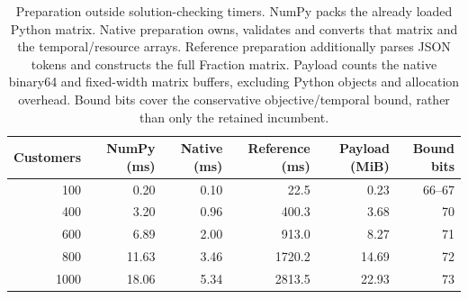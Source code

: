\begin{table}[htbp]
\centering\small
\begin{tabular}{@{}rrrrrr@{}}
\toprule
Customers & NumPy (ms) & Native (ms) & Reference (ms) & Payload (MiB) & Bound bits\\
\midrule
100 & 0.20 & 0.10 & 22.5 & 0.23 & 66--67\\
400 & 3.20 & 0.96 & 400.3 & 3.68 & 70\\
600 & 6.89 & 2.00 & 913.0 & 8.27 & 71\\
800 & 11.63 & 3.46 & 1720.2 & 14.69 & 72\\
1000 & 18.06 & 5.34 & 2813.5 & 22.93 & 73\\
\bottomrule
\end{tabular}
\caption{Preparation outside solution-checking timers. NumPy packs the already loaded Python matrix. Native preparation owns, validates and converts that matrix and the temporal/resource arrays. Reference preparation additionally parses JSON tokens and constructs the full Fraction matrix. Payload counts the native binary64 and fixed-width matrix buffers, excluding Python objects and allocation overhead. Bound bits cover the conservative objective/temporal bound, rather than only the retained incumbent.}\label{tab:native-preparation}
\end{table}
